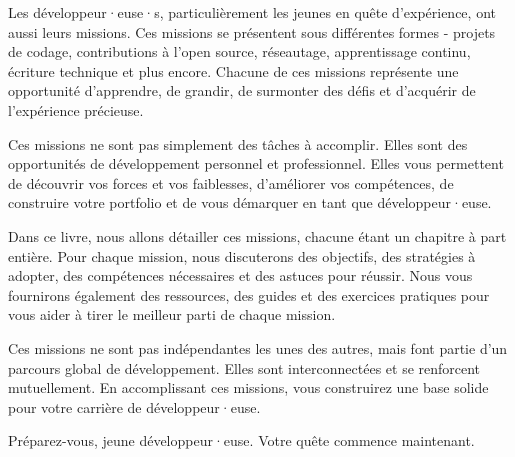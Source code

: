Les développeur·euse·s, particulièrement les jeunes en quête d'expérience, ont aussi leurs missions. Ces missions se présentent sous différentes formes - projets de codage, contributions à l'open source, réseautage, apprentissage continu, écriture technique et plus encore. Chacune de ces missions représente une opportunité d'apprendre, de grandir, de surmonter des défis et d'acquérir de l'expérience précieuse.

Ces missions ne sont pas simplement des tâches à accomplir. Elles sont des opportunités de développement personnel et professionnel. Elles vous permettent de découvrir vos forces et vos faiblesses, d'améliorer vos compétences, de construire votre portfolio et de vous démarquer en tant que développeur·euse.

Dans ce livre, nous allons détailler ces missions, chacune étant un chapitre à part entière. Pour chaque mission, nous discuterons des objectifs, des stratégies à adopter, des compétences nécessaires et des astuces pour réussir. Nous vous fournirons également des ressources, des guides et des exercices pratiques pour vous aider à tirer le meilleur parti de chaque mission.

Ces missions ne sont pas indépendantes les unes des autres, mais font partie d'un parcours global de développement. Elles sont interconnectées et se renforcent mutuellement. En accomplissant ces missions, vous construirez une base solide pour votre carrière de développeur·euse.

Préparez-vous, jeune développeur·euse. Votre quête commence maintenant.























